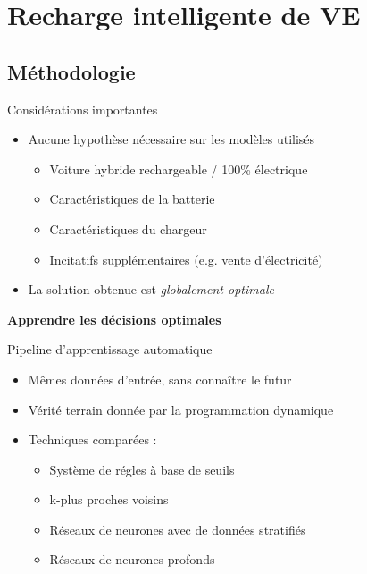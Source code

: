 \documentclass[french]{beamer}
\begin{document}
{\section{Recharge intelligente de VE}

\subsection{Méthodologie}


 \begin{frame}{Considérations importantes}
 \begin{itemize}
 	\item Aucune hypothèse nécessaire sur les modèles utilisés
 	\begin{itemize}
 		\item Voiture hybride rechargeable / 100\% électrique
 		\item Caractéristiques de la batterie
 		\item Caractéristiques du chargeur
 		\item Incitatifs supplémentaires (e.g. vente d'électricité)
 	\end{itemize}
 	\item La solution obtenue est \emph{globalement optimale}
 \end{itemize}
 \end{frame}
 
 


\begin{frame}
\begin{center}
\huge \textbf{Apprendre les décisions optimales}
\end{center}
\end{frame}

\begin{frame}{Pipeline d'apprentissage automatique}
\begin{itemize}
	\item Mêmes données d'entrée, sans connaître le futur
	\item Vérité terrain donnée par la programmation dynamique
	\item Techniques comparées :
	\begin{itemize}
		\item Système de régles à base de seuils
		\item k-plus proches voisins
		\item Réseaux de neurones avec de données stratifiés
		 \item Réseaux de neurones profonds
 

\end{itemize}
\end{itemize}
\end{frame}}
\end{document}
